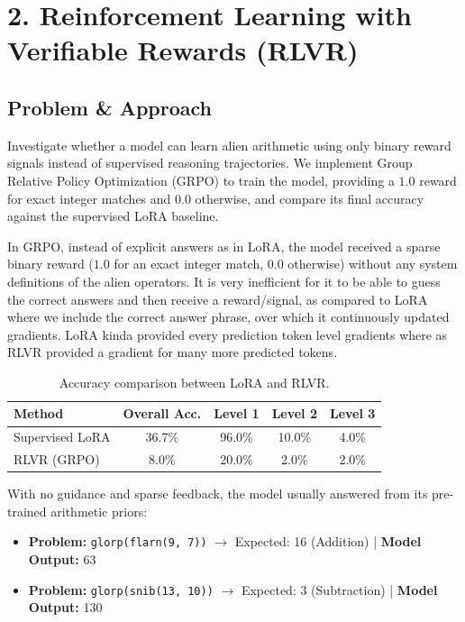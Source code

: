 \section*{2. Reinforcement Learning with Verifiable Rewards (RLVR)}

\subsection*{Problem \& Approach}
Investigate whether a model can learn alien arithmetic using only binary reward signals instead of supervised reasoning trajectories. We implement Group Relative Policy Optimization (GRPO) to train the model, providing a $1.0$ reward for exact integer matches and $0.0$ otherwise, and compare its final accuracy against the supervised LoRA baseline.


In GRPO, instead of explicit answers as in LoRA, the model received a sparse binary reward ($1.0$ for an exact integer match, $0.0$ otherwise) without any system definitions of the alien operators. It is very inefficient for it to be able to guess the correct answers and then receive a reward/signal, as compared to LoRA where we include the correct answer phrase, over which it continuously updated gradients.
LoRA kinda provided every prediction token level gradients where as RLVR provided a gradient for many more predicted tokens.
\begin{table}[h]
\centering
\begin{tabular}{l c c c c}
\toprule
\textbf{Method} & \textbf{Overall Acc.} & \textbf{Level 1} & \textbf{Level 2} & \textbf{Level 3} \\
\midrule
Supervised LoRA & 36.7\% & 96.0\% & 10.0\% & 4.0\% \\
RLVR (GRPO) & 8.0\% & 20.0\% & 2.0\% & 2.0\% \\
\bottomrule
\end{tabular}
\caption{Accuracy comparison between LoRA and RLVR.}
\label{tab:rlvr_results}
\end{table}

With no guidance and sparse feedback, the model usually answered from its pre-trained arithmetic priors:
\begin{itemize}
    \item \textbf{Problem:} \texttt{glorp(flarn(9, 7))} $\rightarrow$ Expected: 16 (Addition) | \textbf{Model Output:} 63
    \item \textbf{Problem:} \texttt{glorp(snib(13, 10))} $\rightarrow$ Expected: 3 (Subtraction) | \textbf{Model Output:} 130
\end{itemize}
